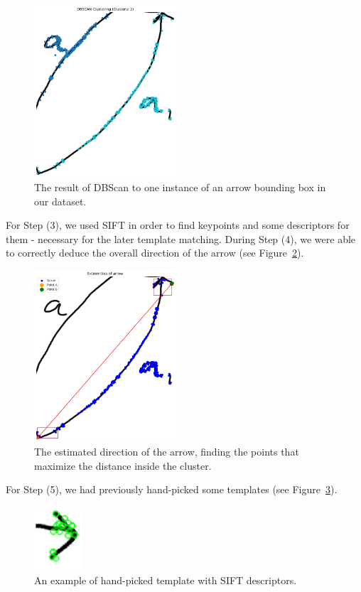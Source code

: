 \documentclass[conference]{IEEEtran}
\begin{document}
\begin{figure}[H]
\centering
\includegraphics[width=150pt]{arrow_double_clustering_clusters.png}
\caption{The result of DBScan to one instance of an arrow bounding box in our dataset.}
\label{fig:arrow_double_clustering_clusters}
\end{figure}

For Step (3), we used SIFT in order to find keypoints and some descriptors for them - necessary for the later template matching.
During Step (4), we were able to correctly deduce the overall direction of the arrow (see Figure~\ref{fig:arrow_double_clustering_direction}).

\begin{figure}[H]
\centering
\includegraphics[width=150pt]{arrow_double_clustering_direction.png}
\caption{The estimated direction of the arrow, finding the points that maximize the distance inside the cluster.}
\label{fig:arrow_double_clustering_direction}
\end{figure}

For Step (5), we had previously hand-picked some templates (see Figure~\ref{fig:templates}).

\begin{figure}[H]
\centering
\includegraphics[width=50pt]{templates.png}
\caption{An example of hand-picked template with SIFT descriptors.}
\label{fig:templates}
\end{figure}
\end{document}

